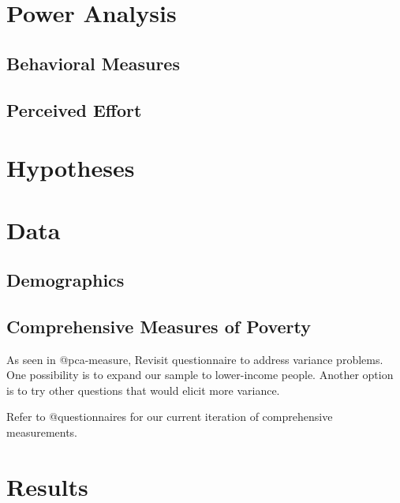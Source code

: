 \documentclass[
]{report}
\begin{document}
\hypertarget{power-analysis}{%
\section{Power Analysis}\label{power-analysis}}

\hypertarget{behavioral-measures}{%
\subsection{Behavioral Measures}\label{behavioral-measures}}

\hypertarget{perceived-effort}{%
\subsection{Perceived Effort}\label{perceived-effort}}

\hypertarget{hypotheses-1}{%
\section{Hypotheses}\label{hypotheses-1}}

\hypertarget{data-1}{%
\section{Data}\label{data-1}}

\hypertarget{demographics-1}{%
\subsection{Demographics}\label{demographics-1}}

\hypertarget{comprehensive-measures-of-poverty}{%
\subsection{Comprehensive Measures of
Poverty}\label{comprehensive-measures-of-poverty}}

As seen in @pca-measure, Revisit questionnaire to address variance
problems. One possibility is to expand our sample to lower-income
people. Another option is to try other questions that would elicit more
variance.

Refer to @questionnaires for our current iteration of comprehensive
measurements.

\hypertarget{results-1}{%
\section{Results}\label{results-1}}
\end{document}
